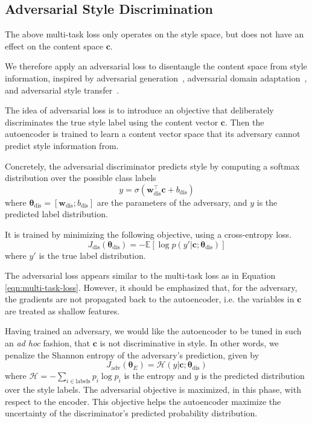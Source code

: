 \documentclass[11pt,a4paper]{article}
\newcommand{\loss}[1]{J_\text{#1}}
\begin{document}
\subsection{Adversarial Style Discrimination} \label{ssec:adversarial-style-objective}

The above multi-task loss only operates on the style space, but does not have an effect on the content space $\bm c$.

We therefore apply an adversarial loss to disentangle the content space from style information, inspired by adversarial generation~\cite{goodfellow2014generative}, adversarial domain adaptation~\cite{liu2017adversarial}, and adversarial style transfer~\cite{fu2017style}.

The idea of adversarial loss is to introduce an objective that deliberately discriminates the true style label using the content vector $\bm c$. Then the autoencoder is trained to learn a content vector space that its adversary cannot predict style information from.

Concretely, the adversarial discriminator predicts style by computing a softmax distribution over the possible class labels
\begin{equation}
	y = \sigma(\bm w_\text{dis}^\top \bm c + b_\text{dis})
\end{equation}
where $\bm\theta_\text{dis}=[\bm w_\text{dis}; b_\text{dis}]$ are the parameters of the adversary, and $y$ is the predicted label distribution.

It is trained by minimizing the following objective, using a cross-entropy loss.
\begin{equation} \label{eqn:adv-disc-loss}
	\loss{dis}(\bm\theta_\text{dis}) =
	- \mathbb{E} [\log p(y' | \bm c; \bm\theta_\text{dis})]
\end{equation}
where $y'$ is the true label distribution.

The adversarial loss appears similar to the multi-task loss as in Equation \ref{eqn:multi-task-loss}. However, it should be emphasized that, for the adversary, the gradients are not propagated back to the autoencoder, i.e. the variables in $\bm c$ are treated as shallow features.

Having trained an adversary, we would like the autoencoder to be tuned in such an \textit{ad hoc} fashion, that $\bm c$ is not discriminative in style. In other words, we penalize the Shannon entropy of the adversary's prediction, given by
\begin{equation}
	\loss{adv}(\bm\theta_E)=\mathcal{H}(y|\bm c; \bm\theta_\text{dis})
\end{equation}
where $\mathcal{H}=-\sum_{i\in\text{labels}}p_i\log p_i$ is the entropy and $y$ is the predicted distribution over the style labels. The adversarial objective is maximized, in this phase, with respect to the encoder. This objective helps the autoencoder maximize the uncertainty of the discriminator's predicted probability distribution.
\end{document}

